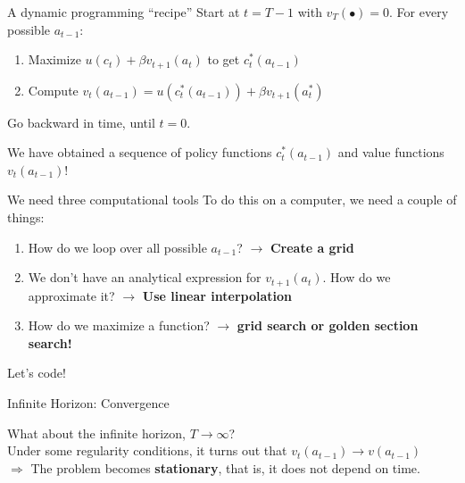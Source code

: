 \documentclass[
  10pt,
  ignorenonframetext,
  aspectratio=43,
  english,
]{beamer}
\providecommand{\tightlist}{%
  \setlength{\itemsep}{0pt}\setlength{\parskip}{0pt}}
\begin{document}
\begin{frame}{A dynamic programming ``recipe''}
\protect{}\label{a-dynamic-programming-recipe}
Start at \(t=T-1\) with \(v_{T}(\bullet)=0\). For every possible
\(a_{t-1}\):

\begin{enumerate}
\tightlist
\item Maximize \(u(c_t)+ \beta v_{t+1}(a_{t})\) to get \(c_t^{\ast}(a_{t-1})\)
\item Compute \(v_t(a_{t-1})=u(c_{t}^{\ast}(a_{t-1}))+\beta v_{t+1}(a_{t}^{\ast})\)
\end{enumerate}

Go backward in time, until \(t=0\).

We have obtained a sequence of policy functions \(c_t^{\ast}(a_{t-1})\) and value functions \(v_t(a_{t-1})\)!
\end{frame}

\begin{frame}{We need three computational tools}
\protect{}\label{we-need-three-computational-tools}
To do this on a computer, we need a couple of things: \vspace{5mm}

\begin{enumerate}
\tightlist
\item How do we loop over all possible \(a_{t-1}\)? $\to$ \textbf{Create a grid}
\item We don't have an analytical expression for \(v_{t+1}(a_t)\). How do we approximate it? $\to$ \textbf{Use linear interpolation}
\item How do we maximize a function? $\to$ \textbf{grid search or golden section search!}
\end{enumerate}
\end{frame}

\begin{frame}{}
\protect{}\label{section-1}
\begin{center}
\LARGE Let's code!
\end{center}
\end{frame}

\begin{frame}{Infinite Horizon: Convergence}
\protect{}\label{infinite-horizon-convergence}

What about the infinite horizon, \(T\rightarrow\infty\)?\\

Under some regularity conditions, it turns out that \(v_t(a_{t-1})\to v(a_{t-1})\)\\

\(\Rightarrow\) The problem becomes \textbf{stationary}, that is, it does not depend on time.
\end{frame}
\end{document}

